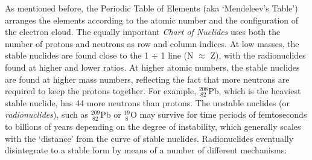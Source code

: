 As mentioned before, the Periodic Table of Elements (aka
`Men\-de\-le\-ev's Table') arranges the elements according to the
atomic number and the configuration of the electron cloud. The equally
important \emph{Chart of Nuclides} uses both the number of protons and
neutrons as row and column indices. At low masses, the stable nuclides
are found close to the 1 $\div$ 1 line (N $\approx$ Z), with the
radionuclides found at higher and lower ratios. At higher atomic
numbers, the stable nuclides are found at higher mass numbers,
reflecting the fact that more neutrons are required to keep the
protons together. For example, $^{208}_{~82}$Pb, which is the heaviest
stable nuclide, has 44 more neutrons than protons. The unstable
nuclides (or \emph{radionuclides}), such as $^{209}_{~82}$Pb or
$^{19}_{~8}$O may survive for time periods of femtoseconds to billions
of years depending on the degree of instability, which generally
scales with the `distance' from the curve of stable
nuclides. Radionuclides eventually disintegrate to a stable form by
means of a number of different mechanisms:

